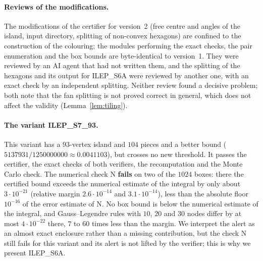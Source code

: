 \documentclass[10pt,a4paper]{article}
\begin{document}
\paragraph{Reviews of the modifications.} The modifications of the certifier for version~2 (free centre and
angles of the island, input directory, splitting of non-convex hexagons) are confined to the construction of
the colouring; the modules performing the exact checks, the pair enumeration and the box bounds are
byte-identical to version~1. They were reviewed by an AI agent that had not written them, and the splitting of
the hexagons and its output for ILEP\_S6A were reviewed by another one, with an exact check by an independent
splitting. Neither review found a decisive problem; both note that the fan splitting is not proved correct in
general, which does not affect the validity (Lemma~\ref{lem:tiling}).

\paragraph{The variant ILEP\_S7\_93.} This variant has a $93$-vertex island and $104$ pieces and a better bound
($5137931/1250000000\approx0.0041103$), but crosses no new threshold. It passes the certifier, the exact
checks of both verifiers, the recomputation and the Monte Carlo check. The numerical check N \textbf{fails} on two of the
$1024$ boxes: there the certified bound exceeds the numerical estimate of the integral by only about $3\cdot10^{-21}$
(relative margin $2.6\cdot10^{-14}$ and $3.1\cdot10^{-14}$), less than the absolute floor $10^{-16}$ of the error
estimate of N. No box bound is below the numerical estimate of the integral, and Gauss--Legendre rules with $10$, $20$ and $30$ nodes
differ by at most $4\cdot10^{-22}$ there, $7$ to $60$ times less than the margin. We interpret the alert as an almost
exact enclosure rather than a missing contribution, but the check N still fails for this variant and its alert is
not lifted by the verifier; this is why we present ILEP\_S6A.
\end{document}

